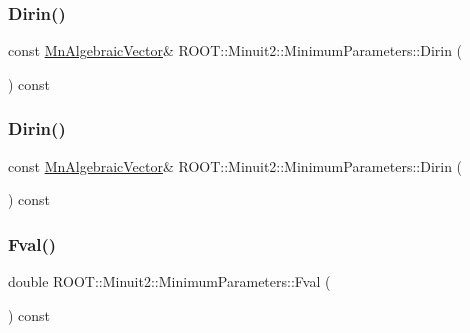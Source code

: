 \subsubsection{\texorpdfstring{Dirin()}{Dirin()}\hspace{0.1cm}{\footnotesize\ttfamily [2/3]}}
{\footnotesize\ttfamily const \mbox{\hyperlink{namespaceROOT_1_1Minuit2_a62ed97730a1ca8d3fbaec64a19aa11c9}{Mn\+Algebraic\+Vector}}\& R\+O\+O\+T\+::\+Minuit2\+::\+Minimum\+Parameters\+::\+Dirin (\begin{DoxyParamCaption}{ }\end{DoxyParamCaption}) const\hspace{0.3cm}{\ttfamily [inline]}}

\mbox{\label{classROOT_1_1Minuit2_1_1MinimumParameters_a2c5c5f0add9ecbdf6b5d4ff962d68d15}} 
\subsubsection{\texorpdfstring{Dirin()}{Dirin()}\hspace{0.1cm}{\footnotesize\ttfamily [3/3]}}
{\footnotesize\ttfamily const \mbox{\hyperlink{namespaceROOT_1_1Minuit2_a62ed97730a1ca8d3fbaec64a19aa11c9}{Mn\+Algebraic\+Vector}}\& R\+O\+O\+T\+::\+Minuit2\+::\+Minimum\+Parameters\+::\+Dirin (\begin{DoxyParamCaption}{ }\end{DoxyParamCaption}) const\hspace{0.3cm}{\ttfamily [inline]}}

\mbox{\label{classROOT_1_1Minuit2_1_1MinimumParameters_a1f9cd63f5947771e367bedd4dafa54e3}} 
\subsubsection{\texorpdfstring{Fval()}{Fval()}\hspace{0.1cm}{\footnotesize\ttfamily [1/3]}}
{\footnotesize\ttfamily double R\+O\+O\+T\+::\+Minuit2\+::\+Minimum\+Parameters\+::\+Fval (\begin{DoxyParamCaption}{ }\end{DoxyParamCaption}) const\hspace{0.3cm}{\ttfamily [inline]}}


